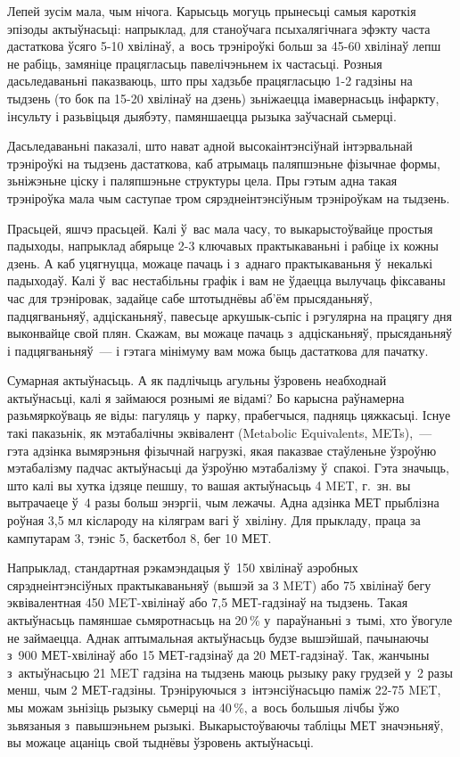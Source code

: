 Лепей зусім мала, чым нічога. Карысьць могуць прынесьці самыя кароткія эпізоды актыўнасьці: напрыклад, для станоўчага псыхалягічнага эфэкту часта дастаткова ўсяго 5-10 хвілінаў, а~вось трэніроўкі больш за 45-60 хвілінаў лепш не рабіць, замяніце працягласьць павелічэньнем іх частасьці. Розныя дасьледаваньні паказваюць, што пры хадзьбе працягласьцю 1-2 гадзіны на тыдзень (то бок па 15-20 хвілінаў на дзень) зьніжаецца імавернасьць інфаркту, інсульту і разьвіцьця дыябэту, памяншаецца рызыка заўчаснай сьмерці.

Дасьледаваньні паказалі, што нават адной высокаінтэнсіўнай інтэрвальнай трэніроўкі на тыдзень дастаткова, каб атрымаць паляпшэньне фізычнае формы, зьніжэньне ціску і паляпшэньне структуры цела. Пры гэтым адна такая трэніроўка мала чым саступае тром сярэднеінтэнсіўным трэніроўкам на тыдзень.

Прасьцей, яшчэ прасьцей. Калі ў~вас мала часу, то выкарыстоўвайце простыя падыходы, напрыклад абярыце 2-3 ключавых практыкаваньні і рабіце іх кожны дзень. А каб уцягнуцца, можаце пачаць і з~аднаго практыкаваньня ў~некалькі падыходаў. Калі ў~вас нестабільны графік і вам не ўдаецца вылучаць фіксаваны час для трэніровак, задайце сабе штотыднёвы аб'ём прысяданьняў, падцягваньняў, адцісканьняў, павесьце аркушык-сьпіс і рэгулярна на працягу дня выконвайце свой плян. Скажам, вы можаце пачаць з~адцісканьняў, прысяданьняў і падцягваньняў~--- і гэтага мінімуму вам можа быць дастаткова для пачатку.

Сумарная актыўнасьць. А як падлічыць агульны ўзровень неабходнай актыўнасьці, калі я займаюся рознымі яе відамі? Бо карысна раўнамерна разьмяркоўваць яе віды: пагуляць у~парку, прабегчыся, падняць цяжкасьці. Існуе такі паказьнік, як мэтабалічны эквівалент (Metabolic Equivalents, METs),~--- гэта адзінка вымярэньня фізычнай нагрузкі, якая паказвае стаўленьне ўзроўню мэтабалізму падчас актыўнасьці да ўзроўню мэтабалізму ў~спакоі. Гэта значыць, што калі вы хутка ідзяце пешшу, то вашая актыўнасьць 4 MET, г.~зн. вы вытрачаеце ў~4 разы больш энэргіі, чым лежачы. Адна адзінка МЕТ прыблізна роўная 3,5 мл кіслароду на кіляграм вагі ў~хвіліну. Для прыкладу, праца за кампутарам 3, тэніс 5, баскетбол 8, бег 10 МЕТ.

Напрыклад, стандартная рэкамэндацыя ў~150 хвілінаў аэробных сярэднеінтэнсіўных практыкаваньняў (вышэй за 3 MET) або 75 хвілінаў бегу эквівалентная 450 MET-хвілінаў або 7,5 МЕТ-гадзінаў на тыдзень. Такая актыўнасьць памяншае сьмяротнасьць на 20\,\% у~параўнаньні з~тымі, хто ўвогуле не займаецца. Аднак аптымальная актыўнасьць будзе вышэйшай, пачынаючы з~900 МЕТ-хвілінаў або 15 МЕТ-гадзінаў да 20 МЕТ-гадзінаў. Так, жанчыны з~актыўнасьцю 21 MET гадзіна на тыдзень маюць рызыку раку грудзей у~2 разы менш, чым 2 МЕТ-гадзіны. Трэніруючыся з~інтэнсіўнасьцю паміж 22-75 MET, мы можам зьнізіць рызыку сьмерці на 40\,\%, а~вось большыя лічбы ўжо зьвязаныя з~павышэньнем рызыкі. Выкарыстоўваючы табліцы МЕТ значэньняў, вы можаце ацаніць свой тыднёвы ўзровень актыўнасьці.


